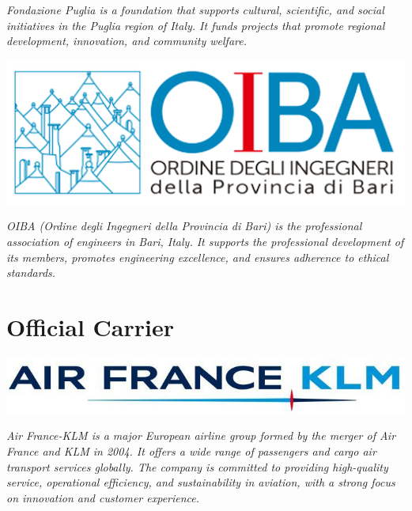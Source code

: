 \documentclass[
	openany, %
	parskip=full, %
	12pt, %
	a4paper, %
]{conferencebooklet} %
\begin{document}
\begin{multicols*}{2}
    \textit{Fondazione Puglia is a foundation that supports cultural, scientific, and social initiatives in the Puglia region of Italy. It funds projects that promote regional development, innovation, and community welfare.}

    \hfill\includegraphics[width=\sponsorscaling\linewidth]{logos/oiba.png}\hspace*{\fill}

    \textit{OIBA (Ordine degli Ingegneri della Provincia di Bari) is the professional association of engineers in Bari, Italy. It supports the professional development of its members, promotes engineering excellence, and ensures adherence to ethical standards.} \\
    
    
    \section{Official Carrier}
    \hfill\includegraphics[width=\sponsorscaling\linewidth]{logos/airline.jpg}\hspace*{\fill}

    \textit{Air France-KLM is a major European airline group formed by the merger of Air France and KLM in 2004. It offers a wide range of passengers and cargo air transport services globally. The company is committed to providing high-quality service, operational efficiency, and sustainability in aviation, with a strong focus on innovation and customer experience.}

\vfill\null
\end{multicols*}


\end{document}
